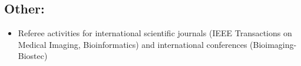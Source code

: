 \subsection*{Other:}
\vspace{1ex}
\begin{itemize}
\item Referee activities for international scientific journals (IEEE Transactions on Medical Imaging, Bioinformatics) and international conferences (Bioimaging-Biostec)
\end{itemize}
